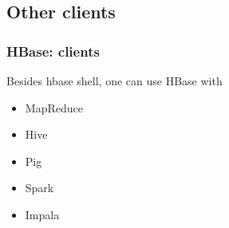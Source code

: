 \documentclass{beamer}
\begin{document}
\subsection{Other clients}
\begin{frame}
 \frametitle{HBase: clients}
 Besides hbase shell, one can use HBase with
 \begin{itemize}
  \item MapReduce
  \item Hive
  \item Pig
  \item Spark
  \item Impala
  \end{itemize}
\end{frame}
\end{document}
